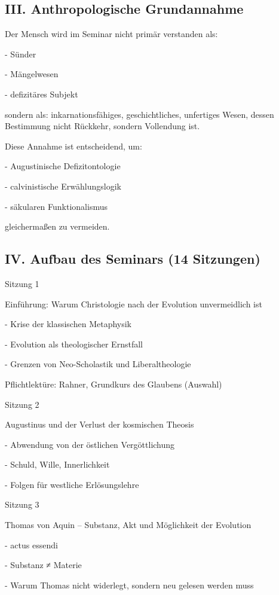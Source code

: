 \documentclass[
  ngerman,
]{article}
\begin{document}
\subsection{III. Anthropologische
Grundannahme}\label{iii.-anthropologische-grundannahme}

Der Mensch wird im Seminar nicht primär verstanden als:

- Sünder

- Mängelwesen

- defizitäres Subjekt

sondern als: inkarnationsfähiges, geschichtliches, unfertiges Wesen,
dessen Bestimmung nicht Rückkehr, sondern Vollendung ist.

Diese Annahme ist entscheidend, um:

- Augustinische Defizitontologie

- calvinistische Erwählungslogik

- säkularen Funktionalismus

gleichermaßen zu vermeiden.

\subsection{IV. Aufbau des Seminars (14
Sitzungen)}\label{iv.-aufbau-des-seminars-14-sitzungen}

Sitzung 1

Einführung: Warum Christologie nach der Evolution unvermeidlich ist

- Krise der klassischen Metaphysik

- Evolution als theologischer Ernstfall

- Grenzen von Neo-Scholastik und Liberaltheologie

Pflichtlektüre: Rahner, Grundkurs des Glaubens (Auswahl)

Sitzung 2

Augustinus und der Verlust der kosmischen Theosis

- Abwendung von der östlichen Vergöttlichung

- Schuld, Wille, Innerlichkeit

- Folgen für westliche Erlösungslehre

Sitzung 3

Thomas von Aquin -- Substanz, Akt und Möglichkeit der Evolution

- actus essendi

- Substanz ≠ Materie

- Warum Thomas nicht widerlegt, sondern neu gelesen werden muss
\end{document}
